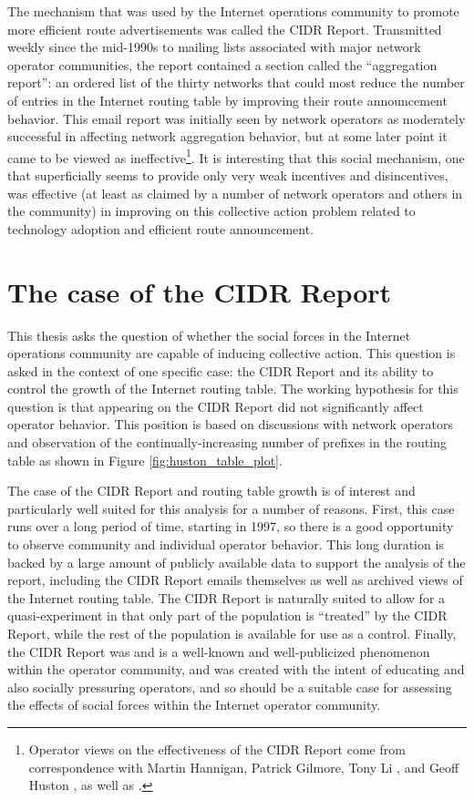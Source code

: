 The mechanism that was used by the Internet operations community to promote
more efficient route advertisements was called the CIDR Report. Transmitted
weekly since the mid-1990s to mailing lists associated with major network
operator communities, the report contained a section called the ``aggregation
report'': an ordered list of the thirty networks that could most reduce the
number of entries in the Internet routing table by improving their route
announcement behavior. This email report was initially seen by network
operators as moderately successful in affecting network aggregation behavior,
but at some later point it came to be viewed as ineffective\footnote{Operator
views on the effectiveness of the CIDR Report come from correspondence with
Martin Hannigan, Patrick Gilmore, Tony Li \cite{Li:2011vn}, and Geoff Huston
\cite{Huston:2011ys}, as well as \cite{Steenbergen:2010nx}.}. It is interesting
that this social mechanism, one that superficially seems to provide only very
weak incentives and disincentives, was effective (at least as claimed by a
number of network operators and others in the community) in improving on this
collective action problem related to technology adoption and efficient route
announcement.

\section{The case of the CIDR Report}

This thesis asks the question of whether the social forces in the Internet
operations community are capable of inducing collective action. This question
is asked in the context of one specific case: the CIDR Report and its ability
to control the growth of the Internet routing table. The working hypothesis for
this question is that appearing on the CIDR Report did not significantly affect
operator behavior. This position is based on discussions with network operators
and observation of the continually-increasing number of prefixes in the routing
table as shown in Figure \ref{fig:huston_table_plot}.

The case of the CIDR Report and routing table growth is of interest and
particularly well suited for this analysis for a number of reasons. First, this
case runs over a long period of time, starting in 1997, so there is a good
opportunity to observe community and individual operator behavior. This long
duration is backed by a large amount of publicly available data to support the
analysis of the report, including the CIDR Report emails themselves as well as
archived views of the Internet routing table. The CIDR Report is naturally
suited to allow for a quasi-experiment in that only part of the population is
``treated'' by the CIDR Report, while the rest of the population is available
for use as a control. Finally, the CIDR Report was and is a well-known and
well-publicized phenomenon within the operator community, and was created
with the intent of educating and also socially pressuring operators, and so
should be a suitable case for assessing the effects of social forces within
the Internet operator community.


